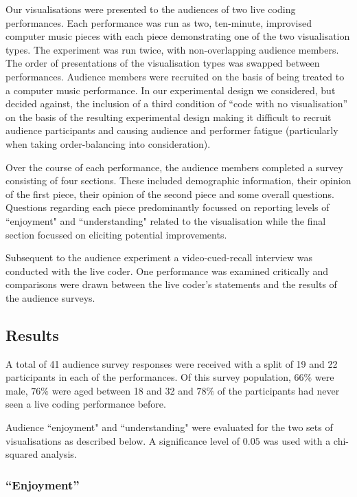 \documentclass{sig-alternate}
\begin{document}
Our visualisations were presented to the audiences of two live coding performances. Each performance was run as two, ten-minute, improvised computer music pieces with each piece demonstrating one of the two visualisation types. The experiment was run twice, with non-overlapping audience members. The order of presentations of the visualisation types was swapped between performances. Audience members were recruited on the basis of being treated to a computer music performance. In our experimental design we considered, but decided against, the inclusion of a third condition of ``code with no visualisation'' on the basis of the resulting experimental design making it difficult to recruit audience participants and causing audience and performer fatigue (particularly when taking order-balancing into consideration). 

Over the course of each performance, the audience members completed a survey consisting of four sections. These included demographic information, their opinion of the first piece, their opinion of the second piece and some overall questions. Questions regarding each piece predominantly focussed on reporting levels of ``enjoyment" and ``understanding" related to the visualisation while the final section focussed on eliciting potential improvements.

Subsequent to the audience experiment a video-cued-recall interview was conducted with the live coder. One performance was examined critically and comparisons were drawn between the live coder's statements and the results of the audience surveys.

\subsection{Results}

A total of 41 audience survey responses were received with a split of 19 and 22 participants in each of the performances. Of this survey population, $66\%$ were male, $76\%$ were aged between 18 and 32 and $78\%$ of the participants had never seen a live coding performance before.

Audience ``enjoyment" and ``understanding" were evaluated for the two sets of visualisations as described below. A significance level of $0.05$ was used with a chi-squared analysis.

\subsubsection{``Enjoyment''}
\end{document}
